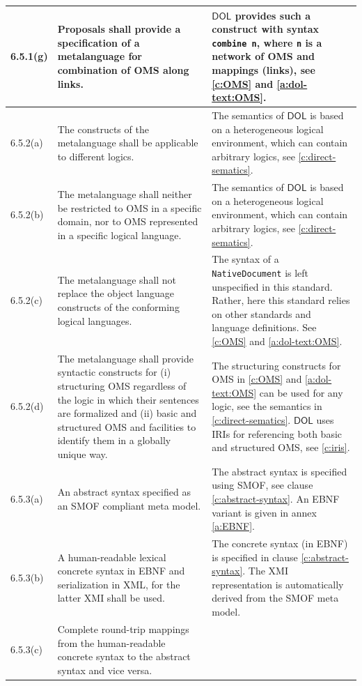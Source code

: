 \documentclass[10pt,fleqn,final]{scrreprt}
\newcommand{\cbs}[0]{\color{red}\xspace} %
\newcommand{\cbe}[0]{\color{black}\xspace} %
\newcommand*{\syntax}[1]{\texttt{#1}}
\newcommand*{\DOL}{\ensuremath{\mathsf{DOL}}\xspace}
\begin{document}
\begin{center}
\begin{longtable}{|p{}|p{}|p{}|}
	\\ \hline
%
6.5.1(g) & 
Proposals shall provide a specification of a metalanguage for combination of OMS along links. 	&
\DOL provides such a construct with syntax \syntax{combine n}, where \syntax{n} is a network of OMS and mappings (links),  see \ref{c:OMS} and \ref{a:dol-text:OMS}.
	\\ \hline
%
6.5.2(a)& 
The constructs of the metalanguage shall be applicable to different logics.	&
The semantics of \DOL is based on a heterogeneous logical
environment, which can contain arbitrary logics, see \ref{c:direct-sematics}.
   \\ \hline
%
6.5.2(b)& 
The metalanguage shall neither be restricted to OMS in a specific domain, nor to OMS represented
in a specific logical language.	&
The semantics of \DOL is based on a heterogeneous logical
environment, which can contain arbitrary logics, see \ref{c:direct-sematics}.
   \\ \hline
%
6.5.2(c)& 
The metalanguage shall not replace the object language constructs of the conforming logical
languages.	&
The syntax of a \syntax{NativeDocument} is left unspecified in this standard. Rather, here this standard relies on other
standards and language definitions.
See \ref{c:OMS} and \ref{a:dol-text:OMS}.
   \\ \hline
%
6.5.2(d)& 
The metalanguage shall provide syntactic constructs for (i) structuring OMS regardless of the
logic in which their sentences are formalized and (ii) basic and structured OMS and facilities to
identify them in a globally unique way.
	&
The structuring constructs for OMS in \ref{c:OMS} and \ref{a:dol-text:OMS} can be used for 
any logic, see the semantics in \ref{c:direct-sematics}. \DOL uses IRIs for referencing both basic and structured OMS, see
\ref{c:iris}.
   \\ \hline
%
6.5.3(a)& 
An abstract syntax specified as an SMOF compliant meta model.	&
\cbs The abstract syntax is specified using SMOF, see clause \ref{c:abstract-syntax}. An EBNF variant is given in annex \ref{a:EBNF}. \cbe
   \\ \hline
%
6.5.3(b)& 
A human-readable lexical concrete syntax in EBNF and serialization in XML, for the latter XMI shall
be used.	&
The concrete syntax (in EBNF) is specified in clause \ref{c:abstract-syntax}. The XMI representation 
is automatically derived from the SMOF meta model.
   \\ \hline
%
6.5.3(c)& 
Complete round-trip mappings from the human-readable concrete syntax to the abstract syntax and
vice versa.	&

\end{longtable}
\end{center}
\end{document}
